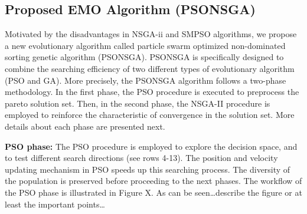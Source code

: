 \documentclass[10pt,journal,compsoc]{IEEEtran}
\newcommand{\Eq}[1]{(\ref{#1})}
\begin{document}
%


\subsection{Proposed EMO Algorithm (PSONSGA)}
Motivated by the disadvantages in NSGA-ii and SMPSO algorithms, we propose a new evolutionary algorithm called particle swarm optimized non-dominated sorting genetic algorithm (PSONSGA). PSONSGA is specifically designed to combine the searching efficiency of two different types of evolutionary algorithm (PSO and GA). More precisely, the PSONSGA algorithm follows a two-phase methodology. In the first phase, the PSO procedure is executed to preprocess the pareto solution set. Then, in the second phase, the NSGA-II procedure is employed to reinforce the characteristic of convergence in the solution set. More details about each phase are presented next.


\noindent\textbf{PSO phase:}
The PSO procedure is employed to explore the decision space, and to test different search directions (see rows 4-13). The position and velocity updating mechanism in PSO speeds up this searching process. The diversity of the population is preserved before proceeding to the next phases. The workflow of the PSO phase is illustrated in Figure X. As can be seen…describe the figure or at least the important points…
\end{document}
